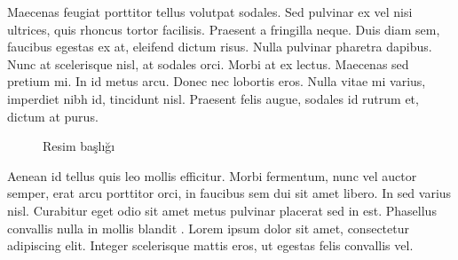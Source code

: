 \documentclass[a4paper,12pt]{report}
\begin{document}
\par
Maecenas feugiat porttitor tellus volutpat sodales. Sed pulvinar ex vel nisi ultrices, quis rhoncus tortor facilisis. Praesent a fringilla neque. Duis diam sem, faucibus egestas ex at, eleifend dictum risus. Nulla pulvinar pharetra dapibus. Nunc at \cite{ref5} scelerisque nisl, at sodales orci. Morbi at ex lectus. Maecenas sed pretium mi. In id metus arcu. Donec nec lobortis eros. Nulla vitae mi varius, imperdiet nibh id, tincidunt nisl. Praesent felis augue, sodales id rutrum et, dictum at purus.

\shorthandoff{=}
\begin{figure}[h]
	\begin{center}
	\end{center}
	\caption{Resim başlığı}
	\label{fig:label}
\end{figure}
\shorthandon{=}

\par
Aenean id tellus quis leo mollis efficitur. Morbi fermentum, nunc vel auctor semper, erat arcu porttitor orci, in faucibus sem dui sit amet libero. In sed varius nisl. Curabitur eget odio sit amet metus pulvinar placerat sed in est. Phasellus convallis nulla in mollis blandit \cite{ref6}. Lorem ipsum dolor sit amet, consectetur adipiscing elit. Integer scelerisque mattis eros, ut egestas felis convallis vel.



  \renewcommand{\bibname}{KAYNAKLAR} %
\end{document}
